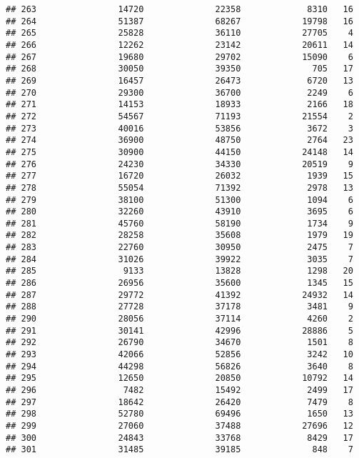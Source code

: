 \documentclass[
]{article}
\begin{document}
\begin{verbatim}
## 263                14720              22358             8310   16
## 264                51387              68267            19798   16
## 265                25828              36110            27705    4
## 266                12262              23142            20611   14
## 267                19680              29702            15090    6
## 268                30050              39350              705   17
## 269                16457              26473             6720   13
## 270                29300              36700             2249    6
## 271                14153              18933             2166   18
## 272                54567              71193            21554    2
## 273                40016              53856             3672    3
## 274                36900              48750             2764   23
## 275                30900              44150            24148   14
## 276                24230              34330            20519    9
## 277                16720              26032             1939   15
## 278                55054              71392             2978   13
## 279                38100              51300             1094    6
## 280                32260              43910             3695    6
## 281                45760              58190             1734    9
## 282                28258              35608             1979   19
## 283                22760              30950             2475    7
## 284                31026              39922             3035    7
## 285                 9133              13828             1298   20
## 286                26956              35600             1345   15
## 287                29772              41392            24932   14
## 288                27728              37178             3481    9
## 290                28056              37114             4260    2
## 291                30141              42996            28886    5
## 292                26790              34670             1501    8
## 293                42066              52856             3242   10
## 294                44298              56826             3640    8
## 295                12650              20850            10792   14
## 296                 7482              15492             2499   17
## 297                18642              26420             7479    8
## 298                52780              69496             1650   13
## 299                27060              37488            27696   12
## 300                24843              33768             8429   17
## 301                31485              39185              848    7

\end{verbatim}
\end{document}
